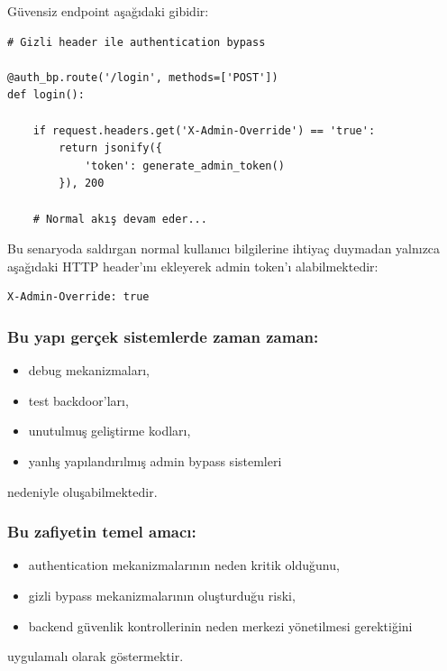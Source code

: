 Güvensiz endpoint aşağıdaki gibidir:

\begin{lstlisting}
# Gizli header ile authentication bypass

@auth_bp.route('/login', methods=['POST'])
def login():

    if request.headers.get('X-Admin-Override') == 'true':
        return jsonify({
            'token': generate_admin_token()
        }), 200

    # Normal akış devam eder...
\end{lstlisting}

Bu senaryoda saldırgan normal kullanıcı bilgilerine ihtiyaç duymadan yalnızca aşağıdaki HTTP header’ını ekleyerek admin token’ı alabilmektedir:

\begin{lstlisting}
X-Admin-Override: true
\end{lstlisting}

\subsubsection{Bu yapı gerçek sistemlerde zaman zaman:}

\begin{itemize}[leftmargin=*]
    \item debug mekanizmaları,
    \item test backdoor’ları,
    \item unutulmuş geliştirme kodları,
    \item yanlış yapılandırılmış admin bypass sistemleri
\end{itemize}

nedeniyle oluşabilmektedir.

\subsubsection{Bu zafiyetin temel amacı:}

\begin{itemize}[leftmargin=*]
    \item authentication mekanizmalarının neden kritik olduğunu,
    \item gizli bypass mekanizmalarının oluşturduğu riski,
    \item backend güvenlik kontrollerinin neden merkezi yönetilmesi gerektiğini
\end{itemize}

uygulamalı olarak göstermektir.

